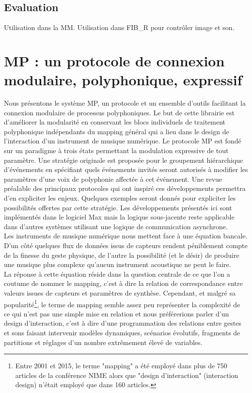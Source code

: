 \subsection{Evaluation}
Utilisation dans la MM. Utilisation dans FIB\_R pour contrôler image et son.


\section{MP : un protocole de connexion modulaire, polyphonique, expressif}
\label{sec:algorithms:MP}

Nous présentons le système MP, un protocole et un ensemble d'outils facilitant la connexion modulaire de processus polyphoniques. Le but de cette librairie est d'améliorer la modularité en conservant les blocs individuels de traitement polyphonique indépendants du mapping général qui a lieu dans le design de l'interaction d'un instrument de musique numérique. Le protocole MP est fondé sur un paradigme à trois états permettant la modulation expressive de tout paramètre. Une stratégie originale est proposée pour le groupement hiérarchique d'événements en spécifiant quels événements invités seront autorisés à modifier les paramètres d'une voix de polyphonie affectée à cet événement. Une revue préalable des principaux protocoles qui ont inspiré ces développements permettra d'en expliciter les enjeux. Quelques exemples seront donnés pour expliciter les possibilités offertes par cette stratégie. Les développements présentés ici sont implémentés dans le logiciel Max mais la logique sous-jacente reste applicable dans d'autres systèmes utilisant une logique de communication asynchrone.\\
\indent Les instruments de musique numérique nous mettent face à une équation bancale. D'un côté quelques flux de données issus de capteurs rendent péniblement compte de la finesse du geste physique, de l'autre la possibilité (et le désir) de produire une musique plus complexe qu'aucun instrument acoustique ne peut le faire.\\
\indent La réponse à cette équation réside dans la question centrale de ce que l'on a coutume de nommer le mapping, c'est à dire la relation de correspondance entre valeurs issues de capteurs et paramètres de synthèse. Cependant, et malgré sa popularité\footnote{ Entre 2001 et 2015, le terme "mapping" a été employé dans plus de 750 articles de la conférence \gls{NIME} alors que "design d'interaction" (interaction design) n'était employé que dans 160 articles.}, le terme de mapping semble assez peu représenter la complexité de ce qui n'est pas une simple mise en relation et nous préférerions parler d'un design d'interaction, c'est à dire d'une programmation des relations entre gestes et sons faisant intervenir modèles dynamiques, scénarios évolutifs, fragments de partitions et réglages d'un nombre extrêmement élevé de variables.\\
